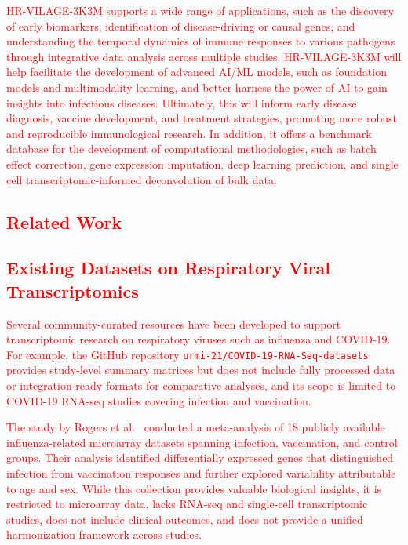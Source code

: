 \documentclass[
  12pt]{article}
\newcommand{\delmark}[1]{\textcolor{red}{#1}}
\begin{document}
\medskip
\delmark{HR-VILAGE-3K3M supports a wide range of applications, such as the discovery of early biomarkers, identification of disease-driving or causal genes, and understanding the temporal dynamics of immune responses to various pathogens through integrative data analysis across multiple studies. HR-VILAGE-3K3M will help facilitate the development of advanced AI/ML models, such as foundation models and multimodality learning, and better harness the power of AI to gain insights into infectious diseases. Ultimately, this will inform early disease diagnosis, vaccine development, and treatment strategies, promoting more robust and reproducible immunological research. In addition, it offers a benchmark database for the development of computational methodologies, such as batch effect correction, gene expression imputation, deep learning prediction, and single cell transcriptomic-informed deconvolution of bulk data.}

\medskip
\delmark{\section{Related Work}}

\delmark{\subsection{Existing Datasets on Respiratory Viral Transcriptomics}}
\delmark{Several community-curated resources have been developed to support transcriptomic research on respiratory viruses such as influenza and COVID-19. For example, the GitHub repository \texttt{urmi-21/COVID-19-RNA-Seq-datasets} provides study-level summary matrices but does not include fully processed data or integration-ready formats for comparative analyses, and its scope is limited to COVID-19 RNA-seq studies covering infection and vaccination.}

\medskip
\delmark{The study by Rogers et al.~\citep{rogers2019} conducted a meta-analysis of 18 publicly available influenza-related microarray datasets spanning infection, vaccination, and control groups. Their analysis identified differentially expressed genes that distinguished infection from vaccination responses and further explored variability attributable to age and sex. While this collection provides valuable biological insights, it is restricted to microarray data, lacks RNA-seq and single-cell transcriptomic studies, does not include clinical outcomes, and does not provide a unified harmonization framework across studies.}
\end{document}
